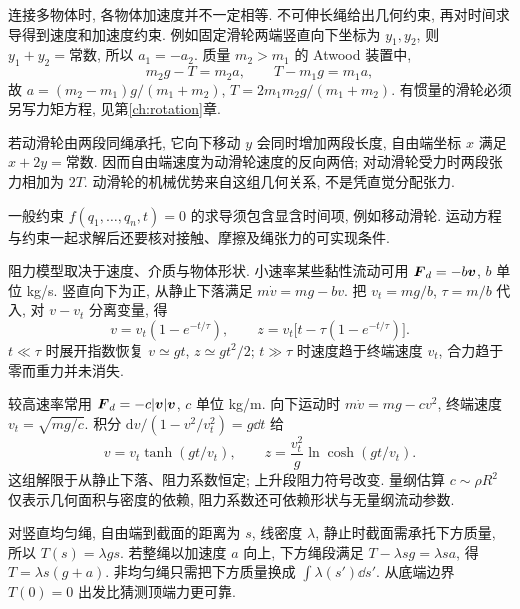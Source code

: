 \label{ch:constraint}
连接多物体时, 各物体加速度并不一定相等. 不可伸长绳给出几何约束, 再对时间求导得到速度和加速度约束. 例如固定滑轮两端竖直向下坐标为 $y_1,y_2$, 则 $y_1+y_2=\text{常数}$, 所以 $a_1=-a_2$. 质量 $m_2>m_1$ 的 Atwood 装置中,
\begin{equation}
m_2g-T=m_2a,\qquad T-m_1g=m_1a,
\end{equation}
故 $a=(m_2-m_1)g/(m_1+m_2)$, $T=2m_1m_2g/(m_1+m_2)$. 有惯量的滑轮必须另写力矩方程, 见第\ref{ch:rotation}章.

若动滑轮由两段同绳承托, 它向下移动 $y$ 会同时增加两段长度, 自由端坐标 $x$ 满足 $x+2y=\text{常数}$. 因而自由端速度为动滑轮速度的反向两倍; 对动滑轮受力时两段张力相加为 $2T$. 动滑轮的机械优势来自这组几何关系, 不是凭直觉分配张力.

一般约束 $f(q_1,\ldots,q_n,t)=0$ 的求导须包含显含时间项, 例如移动滑轮. 运动方程与约束一起求解后还要核对接触、摩擦及绳张力的可实现条件.

阻力模型取决于速度、介质与物体形状. 小速率某些黏性流动可用 $\boldsymbol{F}_d=-b\boldsymbol{v}$, $b$ 单位 kg/s. 竖直向下为正, 从静止下落满足 $m\dot v=mg-bv$. 把 $v_t=mg/b$, $\tau=m/b$ 代入, 对 $v-v_t$ 分离变量, 得
\begin{equation}
v=v_t(1-e^{-t/\tau}),\qquad
z=v_t\bigl[t-\tau(1-e^{-t/\tau})\bigr].
\end{equation}
$t\ll\tau$ 时展开指数恢复 $v\simeq gt$, $z\simeq gt^2/2$; $t\gg\tau$ 时速度趋于终端速度 $v_t$, 合力趋于零而重力并未消失.

较高速率常用 $\boldsymbol{F}_d=-c|\boldsymbol{v}|\boldsymbol{v}$, $c$ 单位 kg/m. 向下运动时 $m\dot v=mg-cv^2$, 终端速度 $v_t=\sqrt{mg/c}$. 积分 $\mathrm dv/(1-v^2/v_t^2)=g\dd t$ 给
\begin{equation}
v=v_t\tanh(gt/v_t),\qquad
z=\frac{v_t^2}{g}\ln\cosh(gt/v_t).
\end{equation}
这组解限于从静止下落、阻力系数恒定; 上升段阻力符号改变. 量纲估算 $c\sim\rho R^2$ 仅表示几何面积与密度的依赖, 阻力系数还可依赖形状与无量纲流动参数.

对竖直均匀绳, 自由端到截面的距离为 $s$, 线密度 $\lambda$, 静止时截面需承托下方质量, 所以 $T(s)=\lambda gs$. 若整绳以加速度 $a$ 向上, 下方绳段满足 $T-\lambda sg=\lambda sa$, 得 $T=\lambda s(g+a)$. 非均匀绳只需把下方质量换成 $\int\lambda(s')\dd s'$. 从底端边界 $T(0)=0$ 出发比猜测顶端力更可靠.


